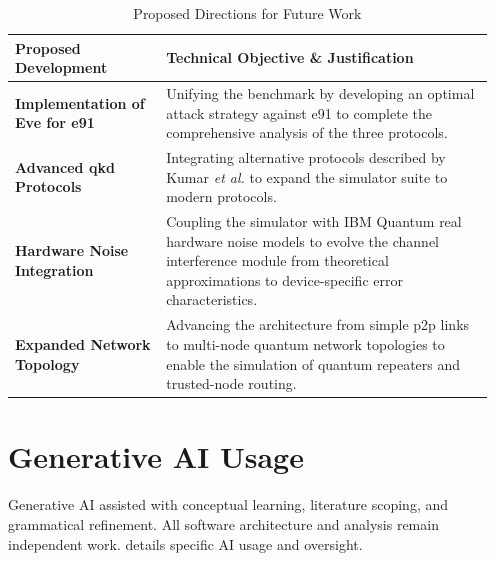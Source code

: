 \documentclass[11pt, a4paper]{report}
\renewcommand{\footnotesize}{\fontsize{9}{10}\selectfont}
\begin{document}
\begin{table}[htbp]
    \centering
    \caption{Proposed Directions for Future Work}
    \label{tab:future_work}
    \renewcommand{\arraystretch}{1.4} %
    \footnotesize
    \begin{tabular}{@{}p{0.3\linewidth} p{0.65\linewidth}@{}}
        \toprule
        \textbf{Proposed Development} & \textbf{Technical Objective \& Justification} \\
        \midrule
        \textbf{Implementation of Eve for \gls{e91}} & Unifying the benchmark by developing an optimal attack strategy against \gls{e91} to complete the comprehensive analysis of the three protocols. \\
        
        \textbf{Advanced \gls{qkd} Protocols} & Integrating alternative protocols described by Kumar \textit{et al.} \cite{Kumar2025} to expand the simulator suite to modern protocols. \\
        
        \textbf{Hardware Noise Integration} & Coupling the simulator with IBM Quantum real hardware noise models to evolve the channel interference module from theoretical approximations to device-specific error characteristics. \\
        
        \textbf{Expanded Network Topology} & Advancing the architecture from simple \gls{p2p} links to multi-node quantum network topologies to enable the simulation of quantum repeaters and trusted-node routing. \\
        \bottomrule
    \end{tabular}
\end{table}

\newpage
\section{Generative AI Usage}
\label{sec:ai_declaration}

Generative AI assisted with conceptual learning, literature scoping, and grammatical refinement. All software architecture and analysis remain independent work.  details specific AI usage and oversight.
\end{document}
